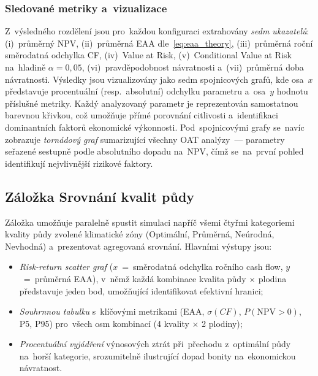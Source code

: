 \subsubsection{Sledované metriky a~vizualizace}

Z~výsledného rozdělení jsou pro~každou konfiguraci extrahovány
\emph{sedm ukazatelů}: (i)~průměrný NPV, (ii)~průměrná EAA
dle~\eqref{eq:eaa_theory}, (iii)~průměrná roční směrodatná odchylka
CF, (iv)~Value at Risk, (v)~Conditional Value at Risk
na~hladině $\alpha = 0{,}05$, (vi)~pravděpodobnost návratnosti
a~(vii)~průměrná doba návratnosti. Výsledky jsou vizualizovány jako
sedm spojnicových grafů, kde osa~$x$ představuje procentuální
(resp.~absolutní) odchylku parametru a~osa~$y$ hodnotu příslušné
metriky. Každý analyzovaný parametr je reprezentován samostatnou
barevnou křivkou, což umožňuje přímé porovnání citlivosti
a~identifikaci dominantních faktorů ekonomické výkonnosti.
Pod~spojnicovými grafy se~navíc zobrazuje \emph{tornádový graf}
sumarizující všechny OAT analýzy~--- parametry seřazené sestupně podle
absolutního dopadu na~NPV, čímž se~na~první pohled identifikují
nejvlivnější rizikové faktory.

\subsection{Záložka Srovnání kvalit půdy}
\label{sec:vystupy_srovnani}

Záložka umožňuje paralelně spustit simulaci napříč všemi čtyřmi
kategoriemi kvality půdy zvolené klimatické zóny (Optimální, Průměrná,
Neúrodná, Nevhodná) a~prezentovat agregovaná srovnání. Hlavními výstupy
jsou:
\begin{itemize}
    \item \emph{Risk-return scatter graf}
          ($x$~=~směrodatná odchylka ročního cash flow,
          $y$~=~průměrná EAA), v~němž každá kombinace kvalita půdy
          $\times$ plodina představuje jeden bod, umožňující
          identifikovat efektivní hranici;
    \item \emph{Souhrnnou tabulku} s~klíčovými metrikami (EAA,
          $\sigma(CF)$, $P(\mathrm{NPV}>0)$, P5, P95) pro~všech
          osm kombinací (4 kvality $\times$ 2 plodiny);
    \item \emph{Procentuální vyjádření} výnosových ztrát při~přechodu
          z~optimální půdy na~horší kategorie, srozumitelně ilustrující
          dopad bonity na~ekonomickou návratnost.
\end{itemize}

